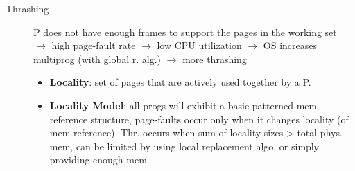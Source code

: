 \begin{description}
    \item[Thrashing] P does not have enough frames to support the pages in the working set $\rightarrow$ high page-fault rate $\rightarrow$ low CPU utilization $\rightarrow$ OS increases multiprog (with global r. alg.) $\rightarrow$ more thrashing
    \begin{itemize}
        \item \textbf{Locality}: set of pages that are actively used together by a P.
        \item \textbf{Locality Model}: all progs will exhibit a basic patterned mem reference structure, page-faults occur only when it changes locality (of mem-reference). Thr. occurs when sum of locality sizes > total phys. mem, can be limited by using local replacement algo, or simply providing enough mem.
    \end{itemize} %
\end{description}
